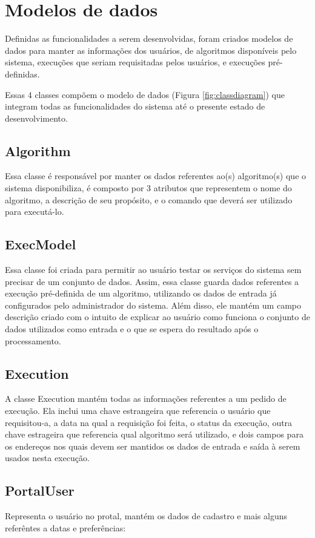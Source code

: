 \documentclass[tg]{mdtufsm}
\begin{document}
\section{Modelos de dados}
Definidas as funcionalidades a serem desenvolvidas, foram criados modelos de dados para manter as informações dos usuários, de algoritmos disponíveis pelo sistema, execuções que seriam requisitadas pelos usuários, e execuções pré-definidas.

Essas 4 classes compõem o modelo de dados (Figura \ref{fig:classdiagram}) que integram todas as funcionalidades do sistema até o presente estado de desenvolvimento.

\subsection{Algorithm}
Essa classe é responsável por manter os dados referentes ao(s) algoritmo(s) que o sistema disponibiliza, é composto por 3 atributos que representem o nome do algoritmo, a descrição de seu propósito, e o comando que deverá ser utilizado para executá-lo.

\subsection{ExecModel}
Essa classe foi criada para permitir ao usuário testar os serviços do sistema sem precisar de um conjunto de dados. Assim, essa classe guarda dados referentes a execução pré-definida de um algoritmo, utilizando os dados de entrada já configurados pelo administrador do sistema. Além disso, ele mantém um campo descrição criado com o intuito de explicar ao usuário como funciona o conjunto de dados utilizados como entrada e o que se espera do resultado após o processamento.

\subsection{Execution}
A classe Execution mantém todas as informações referentes a um pedido de execução. Ela inclui uma chave estrangeira que referencia o usuário que requisitou-a, a data na qual a requisição foi feita, o status da execução, outra chave estrageira que referencia qual algoritmo será utilizado, e dois campos para os endereços nos quais devem ser mantidos os dados de entrada e saída à serem usados nesta execução.

\subsection{PortalUser}
Representa o usuário no protal, mantém os dados de cadastro e mais alguns referêntes a datas e preferências:
\end{document}
